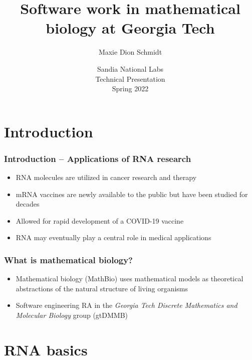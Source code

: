 \documentclass[usenames,svgnames,dvipsnames,11pt]{beamer}
\title[Sandia 2022 -- MathBio Software]{
     Software work in mathematical biology at Georgia Tech
}
\author{Maxie Dion Schmidt} %
\institute[] 
{
\texttt{maxieds@gmail.com} \\ 
\url{http://people.math.gatech.edu/~mschmidt34} \\ 
\url{https://github.com/maxieds}
}
\date[Spring 2022]{Sandia National Labs \\ Technical Presentation \\ Spring 2022} %
\begin{document}
\begin{frame}
\titlepage %
\end{frame} 



\section{Introduction} 

\begin{frame}
\frametitle{Introduction -- Applications of RNA research}
\begin{itemize} 

\item RNA molecules are utilized in cancer research and therapy 
\item mRNA vaccines are newly available to the public but have been studied for decades
\item Allowed for rapid development of a COVID-19 vaccine
\item RNA may eventually play a central role in medical applications 

\end{itemize}

\end{frame}

\begin{frame}
\frametitle{What is mathematical biology?}
\begin{itemize} 

\item Mathematical biology (MathBio) uses mathematical models as 
      theoretical abstractions of the natural structure of living organisms 
\item Software engineering RA in the 
      \emph{Georgia Tech Discrete Mathematics and Molecular Biology} group (gtDMMB)

\end{itemize}

\end{frame}

\section{RNA basics}
\end{document}
